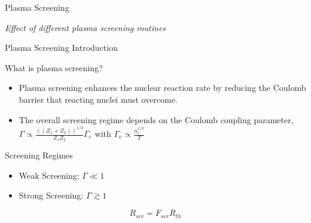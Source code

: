 \documentclass[
	11pt, %
]{beamer}
\begin{document}
\begin{frame}{Plasma Screening}
    \begin{center}
        \Huge {\it Effect of different plasma screening routines}
    \end{center}
\end{frame}

\begin{frame}{Plasma Screening Introduction}
    \begin{block}{What is plasma screening?}
        \begin{itemize}
            \item Plasma screening enhances the nuclear reaction rate by reducing the Coulomb barrier that reacting nuclei must overcome. 
            \item The overall screening regime depends on the Coulomb coupling parameter, $\Gamma \propto \frac{((Z_1 +Z_2))^{1/3}}{Z_1Z_2} \Gamma_{e}$ with $\Gamma_e \propto \frac{n_e^{1/3}}{T}$ 
        \end{itemize}
    \end{block}
    
    \begin{block}{Screening Regimes}
    \begin{itemize}
        \item Weak Screening: $\Gamma \ll 1$
        \item Strong Screening: $\Gamma \gtrsim 1$
    \end{itemize}
    \end{block}
    
    \begin{equation}\label{Eq:screening}
        R_{scr} = F_{scr} R_{th}
    \end{equation}
\end{frame}
\end{document}
